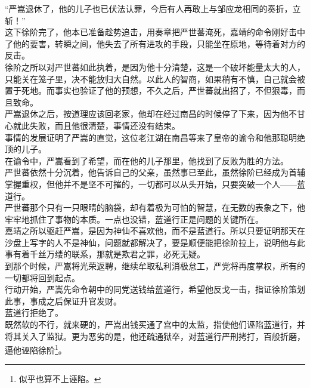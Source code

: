 \begin{multicols}{\theparacolNo}
“严嵩退休了，他的儿子也已伏法认罪，今后有人再敢上与邹应龙相同的奏折，立斩！”\\

这下徐阶完了，他本已准备趁势追击，用奏章把严世蕃淹死，嘉靖的命令刚好击中了他的要害，转瞬之间，他失去了所有进攻的手段，只能坐在原地，等待着对方的反击。\\

徐阶之所以对严世蕃如此执着，是因为他十分清楚，这是一个破坏能量太大的人，只能关在笼子里，决不能放归大自然。以此人的智商，如果稍有不慎，自己就会被置于死地。而事实也验证了他的预想，不久之后，严世蕃就出招了，不但狠毒，而且致命。\\

严嵩退休之后，按道理应该回老家，他却在经过南昌的时候停了下来，因为他不甘心就此失败，而且他很清楚，事情还没有结束。\\

事情的发展证明了严嵩的直觉，这位老江湖在南昌等来了皇帝的谕令和他那聪明绝顶的儿子。\\

在谕令中，严嵩看到了希望，而在他的儿子那里，他找到了反败为胜的方法。\\

严世蕃依然十分沉着，他告诉自己的父亲，虽然事已至此，虽然徐阶已经成为首辅掌握重权，但他并不是坚不可摧的，一切都可以从头开始，只要突破一个人——蓝道行。\\

严世蕃那个只有一只眼睛的脑袋，却有着极为可怕的智慧，在无数的表象之下，他牢牢地抓住了事物的本质。一点也没错，蓝道行正是问题的关键所在。\\

嘉靖之所以驱赶严嵩，是因为神仙不喜欢他，而不是蓝道行。所以只要证明那天在沙盘上写字的人不是神仙，问题就都解决了，要是顺便能把徐阶拉上，说明他与此事有着千丝万缕的联系，那就是欺君之罪，必死无疑。\\

到那个时候，严嵩将光荣返聘，继续牟取私利消极怠工，严党将再度掌权，所有的一切都将回到起点。\\

行动开始，严嵩先命令朝中的同党送钱给蓝道行，希望他反戈一击，指证徐阶策划此事，事成之后保证升官发财。\\

蓝道行拒绝了。\\

既然软的不行，就来硬的，严嵩出钱买通了宫中的太监，指使他们诬陷蓝道行，并将其关入了监狱。更为恶劣的是，他还疏通狱卒，对蓝道行严刑拷打，百般折磨，逼他诬陷徐阶\footnote{似乎也算不上诬陷。}。\\


\end{multicols}
